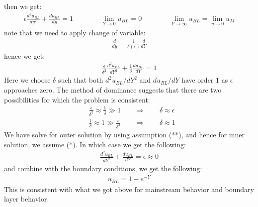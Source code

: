 \documentclass[11pt]{book}
\theoremstyle{break}
\theoremstyle{break}
\begin{document}
then we get:
\begin{align*}
\epsilon \frac{d^2 u_{BL}}{dy^2} + \frac{du_{BL}}{dy} = 1 \qquad \qquad \lim_{Y \to 0}u_{BL} = 0 \qquad\qquad \lim_{Y \to \infty}u_{BL} = \lim_{y\to 0} u_M 
\end{align*}
note that we need to apply change of variable:
\begin{align*}
\frac{d}{dy} = \frac{1}{\delta(\epsilon)}\frac{d}{dY}
\end{align*}
hence we get:
\begin{align*}
\frac{\epsilon}{\delta^2}\frac{d^2 u_{BL}}{dY^2} + \frac{1}{\delta} \frac{d u_{BL}}{dY} = 1
\end{align*}
Here we choose $\delta$ such that both  $d^2u_{BL}/dY^2$ and $du_{BL}/dY$ have order $1$ as $\epsilon$ approaches zero. The method of dominance suggests that there are two possibilities for which the problem is consistent:
\begin{align*}
&\frac{\epsilon}{\delta^2} \approx \frac{1}{\delta} \gg 1 \qquad \Rightarrow \qquad \delta \approx \epsilon \tag{*}\\
&\frac{1}{\delta}\approx 1  \gg \frac{\epsilon}{\delta^2}\qquad \Rightarrow \qquad \delta \approx 1 \tag{**}
\end{align*}
We have solve for outer solution by using assumption (**), and hence for inner solution, we assume (*). In which case we get the following:
\begin{align*}
\frac{d^2u_{BL}}{dY^2} + \frac{du_{BL}}{dY} = \epsilon \approx 0
\end{align*}
and combine with the boundary conditions, we get the following:
\begin{align*}
u_{BL} = 1- e^{-Y}
\end{align*}
This is consistent with what we got above for mainstream behavior and boundary layer behavior.\\
\end{document}
